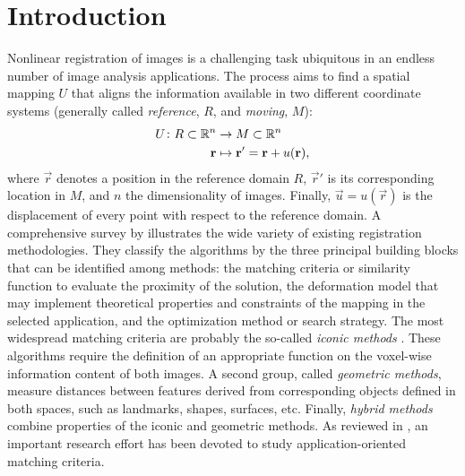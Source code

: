 \section{Introduction}
\label{sec:introduction}

Nonlinear registration of images is a challenging task ubiquitous
  in an endless number of image analysis applications.
The process aims to find a spatial mapping $U$ that aligns the information available
  in two different coordinate systems (generally called
  \emph{reference}, $R$, and \emph{moving}, $M$):
  \begin{align}
  U\colon R \subset \mathbb{R}^n &\to M \subset \mathbb{R}^n \notag\\
  \vec{r} &\mapsto \vec{r}' =\vec{r}+u(\vec{r}),
  \label{eq:transform}
  \end{align}
  where $\vec{r}$ denotes a position in the reference domain $R$, $\vec{r}'$ is
  its corresponding location in $M$, and $n$ the dimensionality of images.
Finally, $\vec{u} = u(\vec{r})$ is the displacement of every point with respect
  to the reference domain.
A comprehensive survey by \citeauthor{sotiras_deformable_2013} \citep{sotiras_deformable_2013}
  illustrates the wide variety of existing registration methodologies.
They classify the algorithms by the three principal building blocks that can be identified
  among methods: the matching criteria or similarity function to evaluate the proximity of
  the solution, the deformation model that may implement theoretical properties and constraints
  of the mapping in the selected application, and the optimization method or search strategy.
The most widespread matching criteria are probably the so-called \emph{iconic
  methods} \citep{sotiras_deformable_2013}.
These algorithms require the definition of an appropriate function on the voxel-wise information
  content of both images.
A second group, called \emph{geometric methods}, measure distances between features derived from
  corresponding objects defined in both spaces, such as landmarks, shapes, surfaces, etc.
Finally, \emph{hybrid methods} combine properties of the iconic and geometric methods.
As reviewed in \citep{sotiras_deformable_2013}, an important research effort has been devoted to
  study application-oriented matching criteria.


